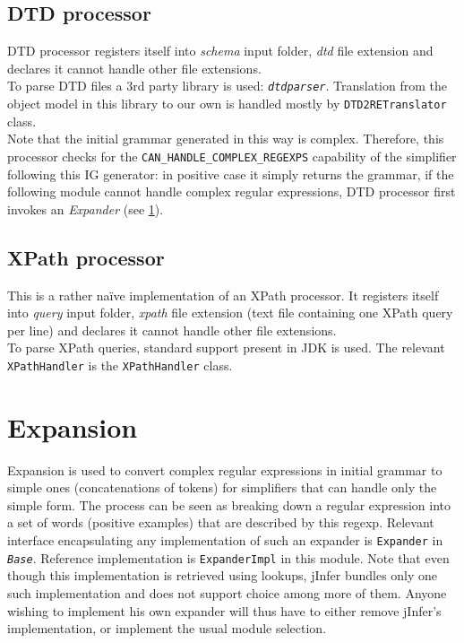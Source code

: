 \documentclass[a4paper,10pt,oneside]{article}
\newcommand{\code}[1]{\texttt{#1}}
\newcommand{\jmodule}[1]{\texttt{\textit{#1}}}
\begin{document}
\subsection{DTD processor}

DTD processor registers itself into \emph{schema} input folder, \emph{dtd} file extension and declares it cannot handle other file extensions.\\
To parse DTD files a 3rd party library is used: \jmodule{dtdparser}. %
Translation from the object model in this library to our own is handled mostly by \code{DTD2RETranslator} class.\\
Note that the initial grammar generated in this way is complex. Therefore, this processor checks for the \code{CAN\_HANDLE\_COMPLEX\_REGEXPS} capability of the simplifier following this IG generator: in positive case it simply returns the grammar, if the following module cannot handle complex regular expressions, DTD processor first invokes an \emph{Expander} (see \ref{section-expansion}).

\subsection{XPath processor}

This is a rather na\"{i}ve implementation of an XPath processor. It registers itself into \emph{query} input folder, \emph{xpath} file extension (text file containing one XPath query per line) and declares it cannot handle other file extensions.\\
To parse XPath queries, standard support present in JDK is used. The relevant \code{XPathHandler} is the \code{XPathHandler} class.\\

\section{Expansion} \label{section-expansion}

Expansion is used to convert complex regular expressions in initial grammar to simple ones (concatenations of tokens) for simplifiers that can handle only the simple form. The process can be seen as breaking down a regular expression into a set of words (positive examples) that are described by this regexp. Relevant interface encapsulating any implementation of such an expander is \code{Expander} in \jmodule{Base}. Reference implementation is \code{ExpanderImpl} in this module. Note that even though this implementation is retrieved using lookups, jInfer bundles only one such implementation and does not support choice among more of them. Anyone wishing to implement his own expander will thus have to either remove jInfer's implementation, or implement the usual module selection. %
\end{document}
